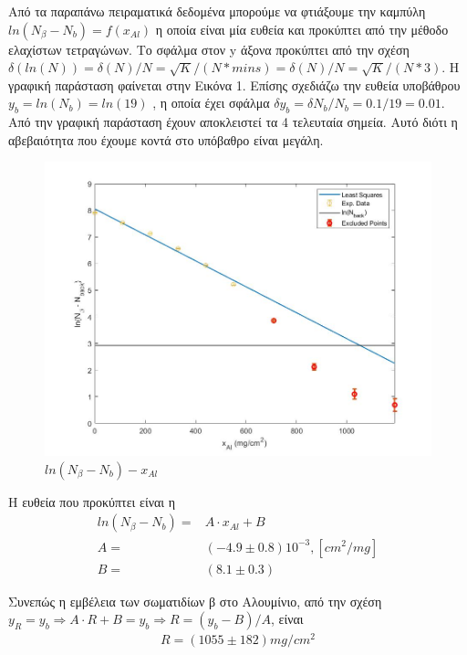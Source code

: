 \documentclass[a4paper]{article}
\begin{document}
		
		Από τα παραπάνω πειραματικά δεδομένα μπορούμε να φτιάξουμε την καμπύλη $ln(N_\beta-N_{b}) = f(x_{Al})$ η οποία είναι μία ευθεία και προκύπτει από την μέθοδο ελαχίστων τετραγώνων. Το σφάλμα στον y άξονα προκύπτει από την σχέση $\delta(ln(N)) = \delta(N) /N = \sqrt{K}/(N*mins) = \delta(N) /N = \sqrt{K}/(N*3)$. Η γραφική παράσταση φαίνεται στην Εικόνα 1. Επίσης σχεδιάζω την ευθεία υποβάθρου $y_b = ln(N_b)=ln(19)$
		, η οποία έχει  σφάλμα $\delta y_b = \delta N_b/N_b = 0.1/19=0.01$. Από την γραφική παράσταση έχουν αποκλειστεί τα 4 τελευταία σημεία. Αυτό διότι η αβεβαιότητα που έχουμε κοντά στο υπόβαθρο είναι μεγάλη.
		\begin{figure}[h!]
			\centering
			\includegraphics[scale=0.4]{fitt1_excl}
			\caption{$ln(N_\beta-N_b) - x_{Al}$}
		\end{figure}
		
		
		Η ευθεία που προκύπτει είναι η 
			\begin{align*}
				ln(N_\beta - N_b) =& A \cdot x_{Al} + B \\
				A                 =& (-4.9\pm0.8)10^{-3}, [cm^2/mg]\\ 
				B                 =& (8.1\pm0.3)
			\end{align*}

		Συνεπώς η εμβέλεια των σωματιδίων β στο Αλουμίνιο, από την σχέση  $y_R = y_b\Rightarrow A\cdot R+ B = y_b\Rightarrow R = (y_b-B)/A$, είναι\footnotemark
			\begin{align*}
				R = (1055 \pm 182) mg/cm^2
			\end{align*}
			
\end{document}
